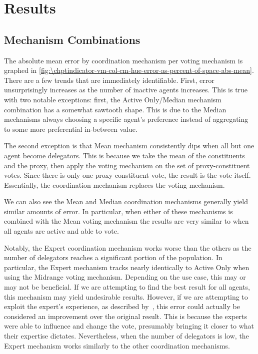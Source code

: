 \section{Results}\label{sec:\chptindicator-results}

\subsection{Mechanism Combinations}\label{subsec:\chptindicator-mechanism-combinations}
The absolute mean error by coordination mechanism per voting mechanism is graphed in
\autoref{fig:\chptindicator-vm-col-cm-hue-error-as-percent-of-space-abs-mean}.
There are a few trends that are immediately identifiable.
First, error unsurprisingly increases as the number of inactive agents increases.
This is true with two notable exceptions: first, the Active Only/Median
mechanism combination has a somewhat sawtooth shape.
This is due to the Median mechanisms always choosing a specific agent's preference
instead of aggregating to some more preferential in-between value.

The second exception is that Mean mechanism consistently dips when all but one agent
become delegators.
This is because we take the mean of the constituents and the proxy, then apply the
voting mechanism on the set of proxy-constituent votes.
Since there is only one proxy-constituent vote, the result is the vote itself.
Essentially, the coordination mechanism replaces the voting mechanism.

We can also see the Mean and Median coordination mechanisms generally yield similar
amounts of error.
In particular, when either of these mechanisms is combined with the Mean voting
mechanism the results are very similar to when all agents are active and able to vote.

Notably, the Expert coordination mechanism works worse than the others as the number
of delegators reaches a significant portion of the population.
In particular, the Expert mechanism tracks nearly identically to Active Only when
using the Midrange voting mechanism.
Depending on the use case, this may or may not be beneficial.
If we are attempting to find the best result for all agents, this mechanism may yield
undesirable results.
However, if we are attempting to exploit the expert's experience, as described
by~\cite{Miller1969}, this error could actually be considered an improvement over
the original result.
This is because the experts were able to influence and change the vote, presumably
bringing it closer to what their expertise dictates.
Nevertheless, when the number of delegators is low, the Expert mechanism works
similarly to the other coordination mechanisms.

